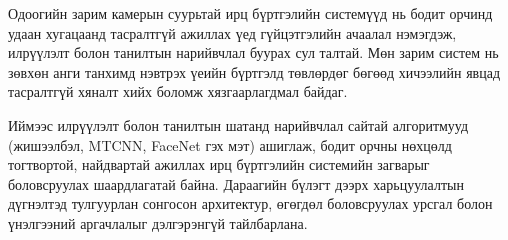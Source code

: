 Одоогийн зарим камерын суурьтай ирц бүртгэлийн системүүд нь бодит орчинд удаан хугацаанд тасралтгүй ажиллах үед гүйцэтгэлийн ачаалал нэмэгдэж, илрүүлэлт болон танилтын нарийвчлал буурах сул талтай. Мөн зарим систем нь зөвхөн анги танхимд нэвтрэх үеийн бүртгэлд төвлөрдөг бөгөөд хичээлийн явцад тасралтгүй хяналт хийх боломж хязгаарлагдмал байдаг.

Иймээс илрүүлэлт болон танилтын шатанд нарийвчлал сайтай алгоритмууд (жишээлбэл, MTCNN, FaceNet гэх мэт) ашиглаж, бодит орчны нөхцөлд тогтвортой, найдвартай ажиллах ирц бүртгэлийн системийн загварыг боловсруулах шаардлагатай байна. Дараагийн бүлэгт дээрх харьцуулалтын дүгнэлтэд тулгуурлан сонгосон архитектур, өгөгдөл боловсруулах урсгал болон үнэлгээний аргачлалыг дэлгэрэнгүй тайлбарлана.